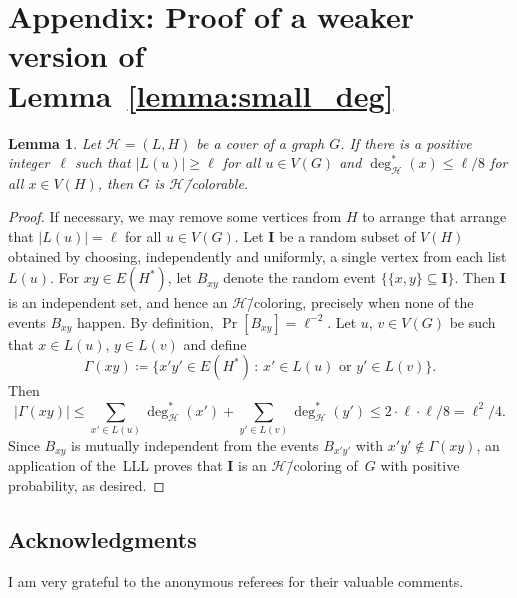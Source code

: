 \documentclass[11pt, reqno, psamsfonts]{amsart}
\newtheorem*{lemma*}{Lemma}
\theoremstyle{definition}
\theoremstyle{remark}
\newcommand{\0}{\varnothing}
\newcommand{\set}[1]{\{#1\}}
\renewcommand{\leq}{\leqslant}
\renewcommand{\geq}{\geqslant}
\newcommand{\defeq}{\coloneqq}
\newcommand{\Cov}[1]{\mathscr{#1}}
\newcommand{\event}[1]{\{{#1}\}}
\renewcommand{\mathbf}[1]{{\bm{#1}}}
\numberwithin{equation}{section}
\begin{document}
	
	\appendix
	
	\section*{Appendix: Proof of a weaker version of Lemma~\ref{lemma:small_deg}}
	
	\begin{lemma*}
		Let $\Cov{H} = (L, H)$ be a cover of a graph $G$. If there is a positive integer~$\ell$ such that $|L(u)| \geq \ell$ for all $u \in V(G)$ and $\deg_{\Cov{H}}^\ast(x) \leq \ell/8$ for all $x \in V(H)$, then $G$ is $\Cov{H}$\=/colorable. 
	\end{lemma*}
	\begin{proof}
		If necessary, we may remove some vertices from $H$ to arrange that %
		arrange that $|L(u)| = \ell$ for all $u \in V(G)$.
	Let $\mathbf{I}$ be a random subset of $V(H)$ obtained by choosing, independently and uniformly, a single vertex from each list $L(u)$. For $xy \in E(H^\ast)$, let $B_{xy}$ denote the random event $\event{\set{x, y} \subseteq \mathbf{I}}$. Then $\mathbf{I}$ is an independent set, and hence an $\Cov{H}$\=/coloring, precisely when none of the events $B_{xy}$ happen.
	By definition, $\Pr\left[B_{xy}\right] = \ell^{-2}$. Let $u$, $v \in V(G)$ be such that $x \in L(u)$, $y \in L(v)$ and define
	\[
	\Gamma(xy) \defeq \set{x'y' \in E(H^\ast) \,:\, x' \in L(u) \text{ or } y' \in L(v)}.
	\] 
	Then
	\[\label{eq:degree}
	|\Gamma(xy)| \leq \sum_{x' \in L(u)} \deg_{\Cov{H}}^\ast(x') + \sum_{y' \in L(v)} \deg_{\Cov{H}}^\ast(y') \leq 2 \cdot \ell \cdot \ell/8 =  \ell^2/4.
	\]
	Since $B_{xy}$ is mutually independent from the events $B_{x'y'}$ with $x'y' \not \in \Gamma(xy)$, an application of the~LLL proves that $\mathbf{I}$ is an $\Cov{H}$\=/coloring of~$G$ with positive probability, as desired.
	\end{proof}
	
	
	\subsection*{Acknowledgments} I am very grateful to the anonymous referees for their valuable comments.
	
	{
	\printbibliography}
\end{document}
